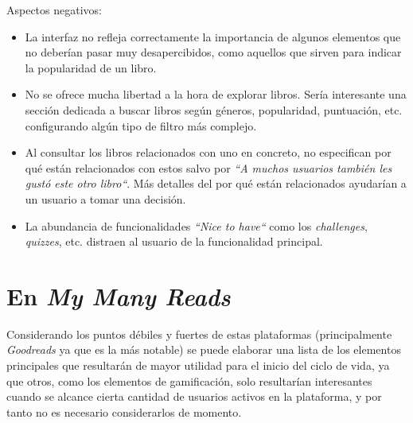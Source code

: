 Aspectos negativos:

\begin{itemize}
\item La interfaz no refleja correctamente la importancia de algunos elementos que no deberían pasar muy desapercibidos, como aquellos que sirven para indicar la popularidad de un libro.
\item No se ofrece mucha libertad a la hora de explorar libros. Sería interesante una sección dedicada a buscar libros según géneros, popularidad, puntuación, etc. configurando algún tipo de filtro más complejo.
\item Al consultar los libros relacionados con uno en concreto, no especifican por qué están relacionados con estos salvo por \textit{``A muchos usuarios también les gustó este otro libro``}. Más detalles del por qué están relacionados ayudarían a un usuario a tomar una decisión.
\item La abundancia de funcionalidades \textit{``Nice to have``} como los \textit{challenges}, \textit{quizzes}, etc. distraen al usuario de la funcionalidad principal.
\end{itemize}

\section{En \textit{My Many Reads}}

Considerando los puntos débiles y fuertes de estas plataformas (principalmente \textit{Goodreads} ya que es la más notable) se puede elaborar una lista de los elementos principales que resultarán de mayor utilidad para el inicio del ciclo de vida, ya que otros, como los elementos de gamificación, solo resultarían interesantes cuando se alcance cierta cantidad de usuarios activos en la plataforma, y por tanto no es necesario considerarlos de momento.

